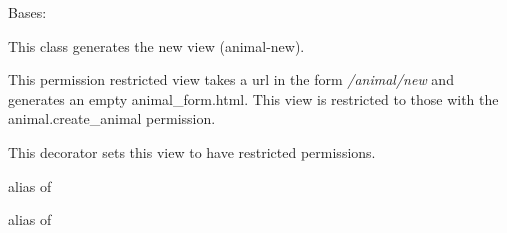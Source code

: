 \documentclass[letterpaper,10pt,english]{sphinxmanual}
\begin{document}
\begin{fulllineitems}
\label{api:mousedb.animal.views.AnimalCreate}
Bases: \href{http://docs.djangoproject.com/en/dev/ref/class-based-views/\#django.views.generic.edit.CreateView}{}

This class generates the new {\hyperref[api:mousedb.animal.models.Animal]{}} view (animal-new).

This permission restricted view takes a url in the form \emph{/animal/new} and generates an empty animal\_form.html.
This view is restricted to those with the animal.create\_animal permission.

\begin{fulllineitems}
\label{api:mousedb.animal.views.AnimalCreate.dispatch}
This decorator sets this view to have restricted permissions.

\end{fulllineitems}


\begin{fulllineitems}
\label{api:mousedb.animal.views.AnimalCreate.form_class}
alias of 

\end{fulllineitems}


\begin{fulllineitems}
\label{api:mousedb.animal.views.AnimalCreate.model}
alias of 

\end{fulllineitems}


\begin{fulllineitems}
\label{api:mousedb.animal.views.AnimalCreate.template_name}
\end{fulllineitems}


\end{fulllineitems}
\end{document}

